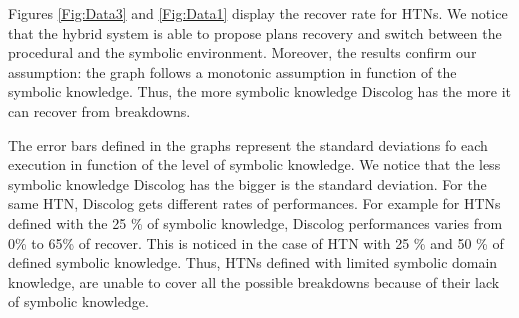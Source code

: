 \documentclass[conference]{IEEEtran}
\begin{document}
			
	\par  Figures \ref{Fig:Data3} and  \ref{Fig:Data1} display the recover rate for HTNs. We notice that the hybrid system is able to propose plans recovery and switch between the procedural and the symbolic environment. Moreover, the results confirm our assumption: the graph follows a monotonic assumption in function of the symbolic knowledge. Thus, the more symbolic knowledge Discolog has the more it can recover from breakdowns. 

	The error bars defined in the graphs represent the standard deviations fo each execution in function of the level of symbolic knowledge.  We notice that the less symbolic knowledge Discolog has the bigger is the standard deviation.  For the same HTN, Discolog gets different rates of performances. For example for HTNs defined with the 25 \% of symbolic knowledge, Discolog performances varies from  0\% to 65\%  of recover. This is noticed in the case of HTN with 25 \% and 50 \% of defined symbolic knowledge. Thus, HTNs  defined with limited symbolic domain knowledge, are unable to cover all the possible breakdowns because of their lack of symbolic knowledge. 
	

	 
\end{document}
